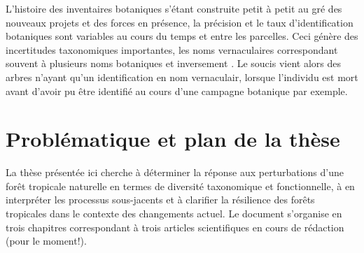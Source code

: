 \documentclass[
  11pt,
  french,
  A4paper,
  extrafontsizes,onecolumn,openright
  ]{memoir}
\begin{document}
L'histoire des inventaires botaniques s'étant construite petit à petit
au gré des nouveaux projets et des forces en présence, la précision et
le taux d'identification botaniques sont variables au cours du temps et
entre les parcelles. Ceci génère des incertitudes taxonomiques
importantes, les noms vernaculaires correspondant souvent à plusieurs
noms botaniques et inversement \autocite{Oldeman1968}. Le soucis vient
alors des arbres n'ayant qu'un identification en nom vernaculair,
lorsque l'individu est mort avant d'avoir pu être identifié au cours
d'une campagne botanique par exemple.

\section{Problématique et plan de la
thèse}\label{problematique-et-plan-de-la-these}

La thèse présentée ici cherche à déterminer la réponse aux perturbations
d'une forêt tropicale naturelle en termes de diversité taxonomique et
fonctionnelle, à en interpréter les processus sous-jacents et à
clarifier la résilience des forêts tropicales dans le contexte des
changements actuel. Le document s'organise en trois chapitres
correspondant à trois articles scientifiques en cours de rédaction (pour
le moment!).
\end{document}
